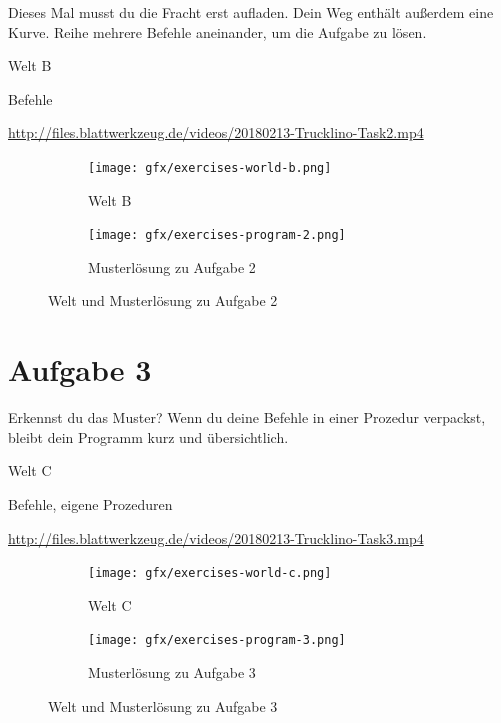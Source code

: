 Dieses Mal musst du die Fracht erst aufladen. Dein Weg enthält außerdem eine Kurve. Reihe mehrere Befehle aneinander, um die Aufgabe zu lösen.

\begin{description}[noitemsep]
  \item[Welt wählen:] Welt B
  \item[Du brauchst:] Befehle
  \item[Video:] \url{http://files.blattwerkzeug.de/videos/20180213-Trucklino-Task2.mp4}
\end{description}

\begin{figure}[H]
  \begin{subfigure}[b]{0.40\textwidth}
    \texttt{[image: gfx/exercises-world-b.png]}
    \caption{Welt B}
  \end{subfigure}\hfill
  \begin{subfigure}[b]{0.40\textwidth}
    \texttt{[image: gfx/exercises-program-2.png]}
    \caption{Musterlösung zu Aufgabe 2}
  \end{subfigure}\hfill
  \caption{Welt und Musterlösung zu Aufgabe 2}
\end{figure}

\pagebreak

\section*{Aufgabe 3}
\label{sec:exercises:3}

Erkennst du das Muster? Wenn du deine Befehle in einer Prozedur verpackst, bleibt dein Programm kurz und übersichtlich.

\begin{description}[noitemsep]
  \item[Welt wählen:] Welt C
  \item[Du brauchst:] Befehle, eigene Prozeduren
  \item[Video:] \url{http://files.blattwerkzeug.de/videos/20180213-Trucklino-Task3.mp4}
\end{description}

\begin{figure}[H]
  \begin{subfigure}[b]{0.40\textwidth}
    \texttt{[image: gfx/exercises-world-c.png]}
    \caption{Welt C}
  \end{subfigure}\hfill
  \begin{subfigure}[b]{0.40\textwidth}
    \texttt{[image: gfx/exercises-program-3.png]}
    \caption{Musterlösung zu Aufgabe 3}
  \end{subfigure}\hfill
  \caption{Welt und Musterlösung zu Aufgabe 3}
\end{figure}

